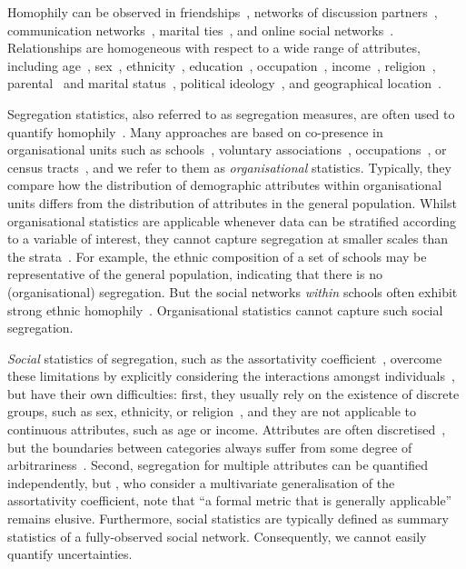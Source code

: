 \documentclass{scrartcl}
\begin{document}
\begin{refsection}
Homophily can be observed in friendships~\cite{Currarini2009, Hipp2009}, networks of discussion partners~\cite{McPherson2006}, communication networks~\cite{Wang2013, Leo2016}, marital ties~\cite{Blau1984}, and online social networks~\cite{Chang2010}. Relationships are homogeneous with respect to a wide range of attributes, including age~\cite{Marsden1988,Smith2014}, sex~\cite{Smith2014}, ethnicity~\cite{Chang2010, Blumenstock2013, Currarini2009}, education~\cite{McPherson2006, Smith2014,Johnson1989}, occupation~\cite{Chan2004}, income~\cite{Leo2016, Wang2013, Johnson1989}, religion~\cite{Platt2012}, parental~\cite{Johnson1989} and marital status~\cite{Kalmijn2007}, political ideology~\cite{Bakshy2015, Boutyline2017}, and geographical location~\cite{Lambiotte2008, Expert2011, Backstrom2010, Scellato2011, Illenberger2013}.

Segregation statistics, also referred to as segregation measures, are often used to quantify homophily~\cite{Rodriguez-Moral2016, Bojanowski2014}. Many approaches are based on co-presence in organisational units such as schools~\cite{Orfield2014}, voluntary associations~\cite{Popielarz1999}, occupations~\cite{Charles1995}, or census tracts~\cite{Reardon2004}, and we refer to them as \emph{organisational} statistics. Typically, they compare how the distribution of demographic attributes within organisational units differs from the distribution of attributes in the general population. Whilst organisational statistics are applicable whenever data can be stratified according to a variable of interest, they cannot capture segregation at smaller scales than the strata~\cite{Blumenstock2013}. For example, the ethnic composition of a set of schools may be representative of the general population, indicating that there is no (organisational) segregation. But the social networks \emph{within} schools often exhibit strong ethnic homophily~\cite{Currarini2009,Moody2001}. Organisational statistics cannot capture such social segregation.

\emph{Social} statistics of segregation, such as the assortativity coefficient~\cite{Newman2003a}, overcome these limitations by explicitly considering the interactions amongst individuals~\cite{Blumenstock2013}, but have their own difficulties: first, they usually rely on the existence of discrete groups, such as sex, ethnicity, or religion~\cite{Bojanowski2014}, and they are not applicable to continuous attributes, such as age or income. Attributes are often discretised~\cite{Lam-Morgan2012, Kalmijn2007, Kim2012}, but the boundaries between categories always suffer from some degree of arbitrariness~\cite{Reardon2004}. Second, segregation for multiple attributes can be quantified independently, but \textcite{Pelechrinis2016}, who consider a multivariate generalisation of the assortativity coefficient, note that ``a formal metric that is generally applicable'' remains elusive. Furthermore, social statistics are typically defined as summary statistics of a fully-observed social network. Consequently, we cannot easily quantify uncertainties.


\end{refsection}
\end{document}
